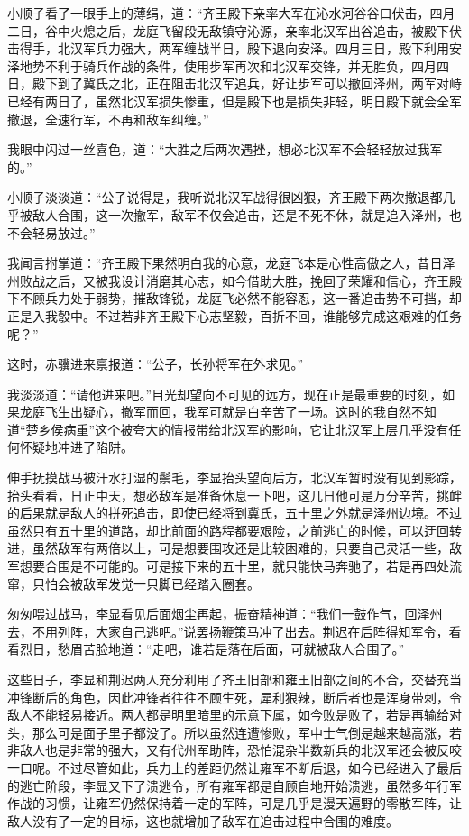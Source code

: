 小顺子看了一眼手上的薄绢，道：“齐王殿下亲率大军在沁水河谷谷口伏击，四月二日，谷中火熄之后，龙庭飞留段无敌镇守沁源，亲率北汉军出谷追击，被殿下伏击得手，北汉军兵力强大，两军缠战半日，殿下退向安泽。四月三日，殿下利用安泽地势不利于骑兵作战的条件，使用步军再次和北汉军交锋，并无胜负，四月四日，殿下到了冀氏之北，正在阻击北汉军追兵，好让步军可以撤回泽州，两军对峙已经有两日了，虽然北汉军损失惨重，但是殿下也是损失非轻，明日殿下就会全军撤退，全速行军，不再和敌军纠缠。”

我眼中闪过一丝喜色，道：“大胜之后两次遇挫，想必北汉军不会轻轻放过我军的。”

小顺子淡淡道：“公子说得是，我听说北汉军战得很凶狠，齐王殿下两次撤退都几乎被敌人合围，这一次撤军，敌军不仅会追击，还是不死不休，就是追入泽州，也不会轻易放过。”

我闻言拊掌道：“齐王殿下果然明白我的心意，龙庭飞本是心性高傲之人，昔日泽州败战之后，又被我设计消磨其心志，如今借助大胜，挽回了荣耀和信心，齐王殿下不顾兵力处于弱势，摧敌锋锐，龙庭飞必然不能容忍，这一番追击势不可挡，却正是入我彀中。不过若非齐王殿下心志坚毅，百折不回，谁能够完成这艰难的任务呢？”

这时，赤骥进来禀报道：“公子，长孙将军在外求见。”

我淡淡道：“请他进来吧。”目光却望向不可见的远方，现在正是最重要的时刻，如果龙庭飞生出疑心，撤军而回，我军可就是白辛苦了一场。这时的我自然不知道“楚乡侯病重”这个被夸大的情报带给北汉军的影响，它让北汉军上层几乎没有任何怀疑地冲进了陷阱。

伸手抚摸战马被汗水打湿的鬃毛，李显抬头望向后方，北汉军暂时没有见到影踪，抬头看看，日正中天，想必敌军是准备休息一下吧，这几日他可是万分辛苦，挑衅的后果就是敌人的拼死追击，即使已经将到冀氏，五十里之外就是泽州边境。不过虽然只有五十里的道路，却比前面的路程都要艰险，之前逃亡的时候，可以迂回转进，虽然敌军有两倍以上，可是想要围攻还是比较困难的，只要自己灵活一些，敌军想要合围是不可能的。可是接下来的五十里，就只能快马奔驰了，若是再四处流窜，只怕会被敌军发觉一只脚已经踏入圈套。

匆匆喂过战马，李显看见后面烟尘再起，振奋精神道：“我们一鼓作气，回泽州去，不用列阵，大家自己逃吧。”说罢扬鞭策马冲了出去。荆迟在后阵得知军令，看看烈日，愁眉苦脸地道：“走吧，谁若是落在后面，可就被敌人合围了。”

这些日子，李显和荆迟两人充分利用了齐王旧部和雍王旧部之间的不合，交替充当冲锋断后的角色，因此冲锋者往往不顾生死，犀利狠辣，断后者也是浑身带刺，令敌人不能轻易接近。两人都是明里暗里的示意下属，如今败是败了，若是再输给对头，那么可是面子里子都没了。所以虽然连遭惨败，军中士气倒是越来越高涨，若非敌人也是非常的强大，又有代州军助阵，恐怕混杂半数新兵的北汉军还会被反咬一口呢。不过尽管如此，兵力上的差距仍然让雍军不断后退，如今已经进入了最后的逃亡阶段，李显又下了溃逃令，所有雍军都是自顾自地开始溃逃，虽然多年行军作战的习惯，让雍军仍然保持着一定的军阵，可是几乎是漫天遍野的零散军阵，让敌人没有了一定的目标，这也就增加了敌军在追击过程中合围的难度。

